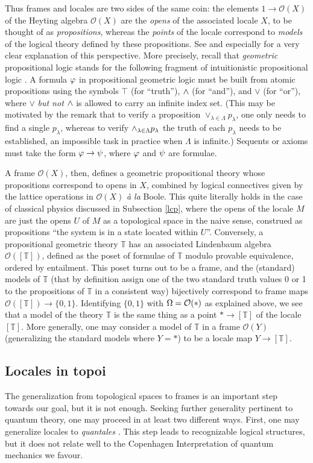 \documentclass[12pt]{article}
\newcommand{\raw}{\rightarrow} \newcommand{\rat}{\mapsto}
\newcommand{\lm}{\lambda} \newcommand{\Lm}{\Lambda}
\newcommand{\CO}{{\mathcal O}} \newcommand{\CP}{{\mathcal P}}
\newcommand{\T}{{\mathbb T}} \newcommand{\Z}{{\mathbb Z}}
\begin{document}
Thus  frames and locales are two sides of the same coin: the elements
$1\raw\CO(X)$  of the Heyting algebra $\CO(X)$ are the {\it opens} of the
associated locale $X$,
to be thought of as {\it propositions}, whereas the {\it points} of the locale
correspond to {\it models} of the logical theory defined by these propositions.
See \cite{johnstone02b,maclanemoerdijk92} and especially \cite{Vic:LocTopSp} for
a very clear explanation of this perspective.
More precisely, recall that {\it geometric} propositional logic stands for
the following  fragment of  intuitionistic propositional  logic
\cite{maclanemoerdijk92,johnstone02b,Vic:LocTopSp}. A formula $\varphi$ in propositional
geometric logic must be  built from
atomic propositions  using the  symbols $\top$ (for ``truth''), $\wedge$ (for
``and''), and $\vee$
(for ``or''),  where
$\vee$ {\it but not $\wedge$} is allowed to carry an infinite index set. (This may
be motivated by the remark that to verify a proposition $\vee_{\lm\in\Lambda}
p_{\lm}$, one only needs to find a single $p_{\lm}$, whereas
to  verify $\wed_{\lm\in\Lambda} p_{\lm}$ the truth of each $p_{\lm}$ needs to
be established, an impossible task in practice when $\Lm$ is infinite.)
Sequents or axioms must take the form  $\phv\raw\ps$, where $\varphi$ and $\psi$ are formulae.

A frame $\CO(X)$, then, defines a geometric propositional theory
 whose propositions
correspond to opens in $X$, combined by logical connectives given by the lattice
operations
in $\CO(X)$ {\it \`a la} Boole.  This quite literally holds in the case of
classical physics discussed in Subsection \ref{lcp},
where the opens of the locale $M$ are just the opens $U$ of $M$ as a topological
space in the naive sense, construed as
propositions ``the system is in a state located within $U$''.
Conversely, a propositional geometric theory $\T$ has an associated Lindenbaum
algebra $\CO([\T])$, defined as the poset  of
formulae of $\T$ modulo provable equivalence, ordered by entailment. This poset
turns out to be a frame, and the (standard) models of $\T$ (that by definition
assign one of the two  standard truth values 0 or 1 to the propositions of $\T$
in a consistent way) bijectively correspond to frame maps $\CO([\T])\raw
\{0,1\}$. Identifying $\{0,1\}$ with $\Om=\CO(*)$ as explained above,
we see that a model of the theory $\T$ is the same thing as a
 point $*\raw [\T]$ of the locale $[\T]$.  More generally, one may consider a
model of
 $\T$ in a frame $\CO(Y)$ (generalizing the standard models where $Y=*$) to be a
 locale map $Y\raw [\T]$.
 \subsection{Locales in topoi}\label{subsection:locale3}
The generalization from topological spaces to frames is
an important step towards our goal, but it is not enough.
Seeking further generality pertinent to quantum theory,
 one may proceed in at least two different ways. First, one may generalize
  locales to {\it
quantales} \cite{Mulvey:andthen}. This step leads to recognizable
logical structures, but it does not relate well to the Copenhagen
Interpretation of quantum mechanics we favour.
\end{document}
